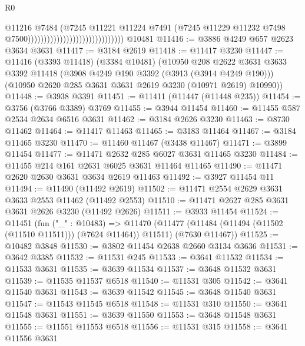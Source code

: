 \begin{lexlean}{R0}
\begin{coremodule}
                                                            @11216
                                                            @7484
                                                            (@7245
                                                              @11221
                                                              @11224
                                                              @7491
                                                              (@7245
                                                                @11229
                                                                @11232
                                                                @7498
                                                                @7500))))))))))))))))))))))))))))))
    @10481
@11416 := @3886 @4249 @657 @2623 @3634 @3631
@11417 := @3184 @2619
@11418 := @11417 @3230
@11447 := @11416
    (@3393 @11418)
    (@3384 @10481)
    (@10950
      @208
      @2622
      @3631
      @3633
      @3392
      @11418
      (@3908 @4249 @190 @3392 (@3913 (@3914 @4249 @190)))
      (@10950 @2620 @285 @3631 @3631 @2619 @3230 (@10971 @2619) @10990))
@11448 := @3938 @3391
@11451 := @11411 (@11447 (@11448 @235))
@11454 := @3756 (@3766 @3389) @3769
@11455 := @3944 @11454
@11460 := @11455 @587 @2534 @2634 @6516 @3631
@11462 := @3184 @2626 @3230
@11463 := @8730 @11462
@11464 := @11417 @11463
@11465 := @3183 @11464
@11467 := @3184 @11465 @3230
@11470 := @11460 @11467 (@3438 @11467)
@11471 := @3899 @11454
@11477 := @11471 @2632 @285 @6027 @3631 @11465 @3230
@11484 := @11455 @214 @161 @2631 @6025 @3631 @11464 @11465
@11490 := @11471 @2620 @2630 @3631 @3634 @2619 @11463
@11492 := @3927 @11454 @11
@11494 := @11490 (@11492 @2619)
@11502 := @11471 @2554 @2629 @3631 @3633 @2553 @11462 (@11492 @2553)
@11510 := @11471 @2627 @285 @3631 @3631 @2626 @3230 (@11492 @2626)
@11511 := @3933 @11454
@11524 := @11451
    (fun ("_" : @10483) =>
    @11470 (@11477 (@11484 (@11494 (@11502 (@11510 @11511))) (@7624 @11464)) @11511) (@7630 @11467))
@11525 := @10482 @3848
@11530 := @3802 @11454 @2638 @2660 @3134 @3636
@11531 := @3642 @3385
@11532 := @11531 @245
@11533 := @3641 @11532
@11534 := @11533 @3631
@11535 := @3639 @11534
@11537 := @3648 @11532 @3631
@11539 := @11535 @11537 @6518
@11540 := @11531 @305
@11542 := @3641 @11540 @3631
@11543 := @3639 @11542
@11545 := @3648 @11540 @3631
@11547 := @11543 @11545 @6518
@11548 := @11531 @310
@11550 := @3641 @11548 @3631
@11551 := @3639 @11550
@11553 := @3648 @11548 @3631
@11555 := @11551 @11553 @6518
@11556 := @11531 @315
@11558 := @3641 @11556 @3631

\end{coremodule}
\end{lexlean}
